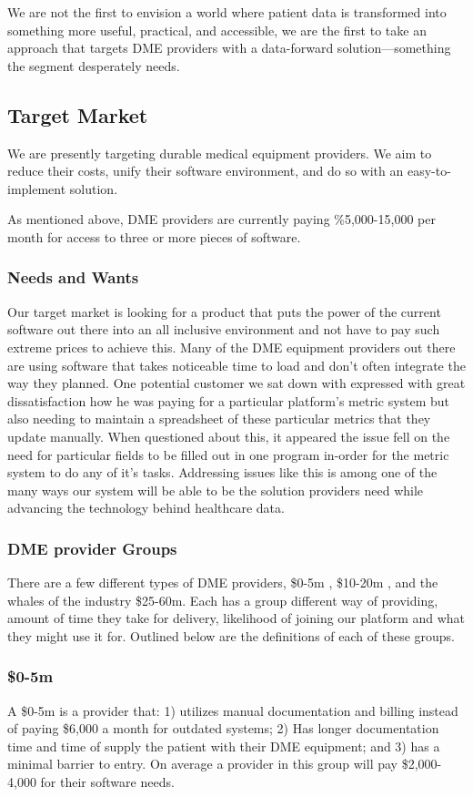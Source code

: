 \documentclass[letterpaper]{article}
\begin{document}
We are not the first to envision a world where patient data is transformed into something more useful, practical, and accessible, we are the first to take an approach that targets DME providers with a data-forward solution---something the segment desperately needs.%

\subsection{Target Market}
We are presently targeting durable medical equipment providers. We aim to reduce their costs, unify their software environment, and do so with an easy-to-implement solution.%

As mentioned above, DME providers are currently paying \%5,000-15,000 per month for access to three or more pieces of software.%

  \subsubsection{Needs and Wants}
  Our target market is looking for a product that puts the power of the current software out there into an all inclusive environment and not have to pay such extreme prices to achieve this. Many of the DME equipment providers out there are using software that takes noticeable time to load and don’t often integrate the way they planned.
%
  One potential customer we sat down with expressed with great dissatisfaction how he was paying for a particular platform’s metric system but also needing to maintain a spreadsheet of these particular metrics that they update manually. When questioned about this, it appeared the issue fell on the need for particular fields to be filled out in one program in-order for the metric system to do any of it’s tasks. Addressing issues like this is among one of the many ways our system will be able to be the solution providers need while advancing the technology behind healthcare data.
%
  \subsubsection{DME provider Groups}
  There are a few different types of DME providers, \$0-5m , \$10-20m , and the whales of the industry \$25-60m. Each has a group different way of providing, amount of time they take for delivery, likelihood of joining our platform and what they might use it for. Outlined below are the definitions of each of these groups.
%
  \subsubsection{\$0-5m}
  A \$0-5m is a provider that: 1) utilizes manual documentation and billing instead of paying \$6,000 a month for outdated systems; 2) Has longer documentation time and time of supply the patient with their DME equipment; and 3) has a minimal barrier to entry. On average a provider in this group will pay \$2,000-4,000 for their software needs.
%
\end{document}
